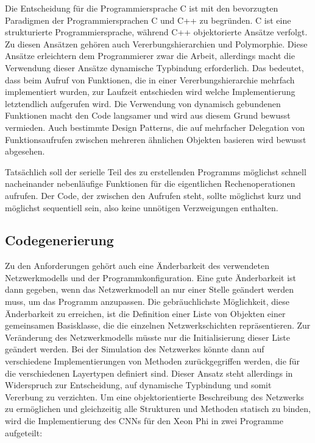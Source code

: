 \documentclass[../main.tex]{subfiles}
\begin{document}
Die Entscheidung für die Programmiersprache C ist mit den bevorzugten Paradigmen der Programmiersprachen C und C++ zu begründen. C ist eine strukturierte Programmiersprache, während C++ objektorierte Ansätze verfolgt. Zu diesen Ansätzen gehören auch Vererbungshierarchien und Polymorphie. Diese Ansätze erleichtern dem Programmierer zwar die Arbeit, allerdings macht die Verwendung dieser Ansätze dynamische Typbindung erforderlich. Das bedeutet, dass beim Aufruf von Funktionen, die in einer Vererbungshierarchie mehrfach implementiert wurden, zur Laufzeit entschieden wird welche Implementierung letztendlich aufgerufen wird. Die Verwendung von dynamisch gebundenen Funktionen macht den Code langsamer und wird aus diesem Grund bewusst vermieden. Auch bestimmte Design Patterns, die auf mehrfacher Delegation von Funktionsaufrufen zwischen mehreren ähnlichen Objekten basieren wird bewusst abgesehen. 

Tatsächlich soll der serielle Teil des zu erstellenden Programms möglichst schnell nacheinander nebenläufige Funktionen für die eigentlichen Rechenoperationen aufrufen. Der Code, der zwischen den Aufrufen steht, sollte möglichst kurz und möglichst sequentiell sein, also keine unnötigen Verzweigungen enthalten. 

\subsection{Codegenerierung} \label{xeonphi:codegen}
Zu den Anforderungen gehört auch eine Änderbarkeit des verwendeten Netzwerkmodells und der Programmkonfiguration. 
Eine gute Änderbarkeit ist dann gegeben, wenn das Netzwerkmodell an nur einer Stelle geändert werden muss, um das Programm anzupassen. Die gebräuchlichste Möglichkeit, diese Änderbarkeit zu erreichen, ist die Definition einer Liste von Objekten einer gemeinsamen Basisklasse, die die einzelnen Netzwerkschichten repräsentieren. Zur Veränderung des Netzwerkmodells müsste nur die Initialisierung dieser Liste geändert werden. Bei der Simulation des Netzwerkes könnte dann auf verschiedene Implementierungen von Methoden zurückgegriffen werden, die für die verschiedenen Layertypen definiert sind. 
Dieser Ansatz steht allerdings in Widerspruch zur Entscheidung, auf dynamische Typbindung und somit Vererbung zu verzichten. Um eine objektorientierte Beschreibung des Netzwerks zu ermöglichen und gleichzeitig alle Strukturen und Methoden statisch zu binden, wird die Implementierung des CNNs für den Xeon Phi in zwei Programme aufgeteilt: 
\end{document}
